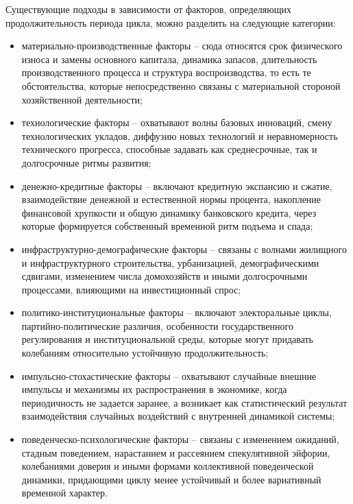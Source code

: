 Существующие подходы в зависимости от факторов, определяющих продолжительность периода цикла, можно разделить на следующие категории:
\begin{itemize}
    \item материально-производственные факторы – сюда относятся срок физического износа и замены основного капитала, динамика запасов, длительность производственного процесса и структура воспроизводства, то есть те обстоятельства, которые непосредственно связаны с материальной стороной хозяйственной деятельности;
    \item технологические факторы – охватывают волны базовых инноваций, смену технологических укладов, диффузию новых технологий и неравномерность технического прогресса, способные задавать как среднесрочные, так и долгосрочные ритмы развития;
    \item денежно-кредитные факторы – включают кредитную экспансию и сжатие, взаимодействие денежной и естественной нормы процента, накопление финансовой хрупкости и общую динамику банковского кредита, через которые формируется собственный временной ритм подъема и спада;
    \item инфраструктурно-демографические факторы – связаны с волнами жилищного и инфраструктурного строительства, урбанизацией, демографическими сдвигами, изменением числа домохозяйств и иными долгосрочными процессами, влияющими на инвестиционный спрос;
    \item политико-институциональные факторы – включают электоральные циклы, партийно-политические различия, особенности государственного регулирования и институциональной среды, которые могут придавать колебаниям относительно устойчивую продолжительность;
    \item импульсно-стохастические факторы – охватывают случайные внешние импульсы и механизмы их распространения в экономике, когда периодичность не задается заранее, а возникает как статистический результат взаимодействия случайных воздействий с внутренней динамикой системы;
    \item поведенческо-психологические факторы – связаны с изменением ожиданий, стадным поведением, нарастанием и рассеянием спекулятивной эйфории, колебаниями доверия и иными формами коллективной поведенческой динамики, придающими циклу менее устойчивый и более вариативный временной характер.
\end{itemize}

